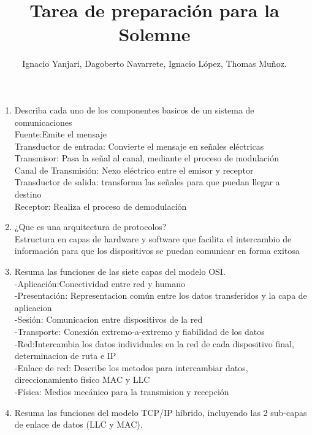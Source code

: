 \documentclass{udparticle}
\title{Tarea de preparación para la Solemne}
\author{Ignacio Yanjari, Dagoberto Navarrete, Ignacio López, Thomas Muñoz.}
\begin{document}
\maketitle
\begin{enumerate}

\item Describa cada uno de los componentes basicos de un sistema de comunicaciones \\
    Fuente:Emite el mensaje\\
    Transductor de entrada: Convierte el mensaje en señales eléctricas\\
    Transmisor: Pasa la señal al canal, mediante el proceso de modulación\\
    Canal de Transmisión: Nexo eléctrico entre el emisor y receptor\\
    Transductor de salida: transforma las señales para que puedan llegar a destino\\
    Receptor: Realiza el proceso de demodulación \\

\item ¿Que es una arquitectura de protocolos? \\
    Estructura en capas de hardware y software que facilita el intercambio de información para que los
    dispositivos se puedan comunicar en forma exitosa\\

\item Resuma las funciones de las siete capas del modelo OSI.\\
    -Aplicación:Conectividad entre red y humano\\
    -Presentación: Representacion común entre los datos transferidos y la capa de aplicacion\\
    -Sesión: Comunicacion entre dispositivos de la red\\
    -Transporte: Conexión extremo-a-extremo y fiabilidad de los datos\\
    -Red:Intercambia los datos individuales en la red de cada dispositivo final, determinacion de ruta e IP\\
    -Enlace de red: Describe los metodos para intercambiar datos, direccionamiento físico MAC y LLC\\
    -Física: Medios mecánico para la transmision y recepción\\
\item Resuma las funciones del modelo TCP/IP híbrido, incluyendo las 2 sub-capas de enlace de datos
(LLC y MAC).\\



\end{enumerate}
\end{document}
